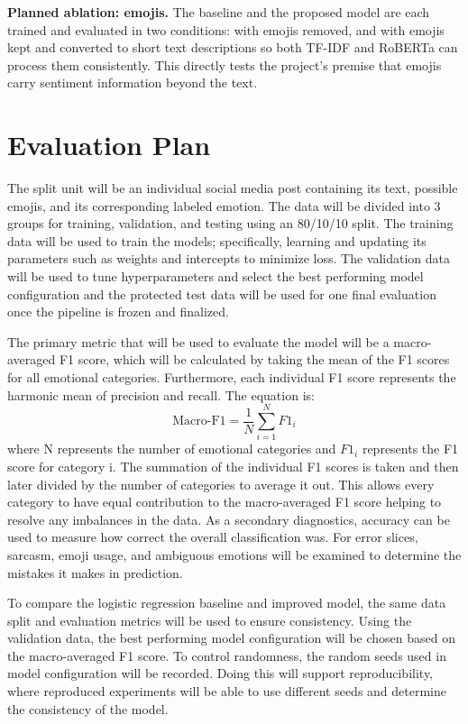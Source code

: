 \documentclass[sigconf,nonacm]{acmart}
\begin{document}
\textbf{Planned ablation: emojis.} The baseline and the proposed model are each trained and evaluated in two conditions: with emojis removed, and with emojis kept and converted to short text descriptions so both TF-IDF and RoBERTa can process them consistently. This directly tests the project's premise that emojis carry sentiment information beyond the text.

\section{Evaluation Plan}
The split unit will be an individual social media post containing its text, possible emojis, and its corresponding labeled emotion. The data will be divided into 3 groups for training, validation, and testing using an 80/10/10 split. The training data will be used to train the models; specifically, learning and updating its parameters such as weights and intercepts to minimize loss. The validation data will be used to tune hyperparameters and select the best performing model configuration and the protected test data will be used for one final evaluation once the pipeline is frozen and finalized.

The primary metric that will be used to evaluate the model will be a macro-averaged F1 score, which will be calculated by taking the mean of the F1 scores for  all emotional categories. Furthermore, each individual F1 score represents the harmonic mean of precision and recall. The equation is: \[
\text{Macro-F1} = \frac{1}{N}\sum_{i=1}^{N} F1_i\] where N represents the number of emotional categories and $F1_i$ represents the F1 score for category i. The summation of the individual F1 scores is taken and then later divided by the number of categories to average it out. This allows every category to have equal contribution to the macro-averaged F1 score helping to resolve any imbalances in the data. As a secondary diagnostics, accuracy can be used to measure how correct the overall classification was. For error slices, sarcasm, emoji usage, and ambiguous emotions will be examined to determine the mistakes it makes in prediction.

To compare the logistic regression baseline and improved model, the same data split and evaluation metrics will be used to ensure consistency. Using the validation data, the best performing model configuration will be chosen based on the macro-averaged F1 score. To control randomness, the random seeds used in model configuration will be recorded. Doing this will support reproducibility, where reproduced experiments will be able to use different seeds and determine the consistency of the model.
\end{document}
